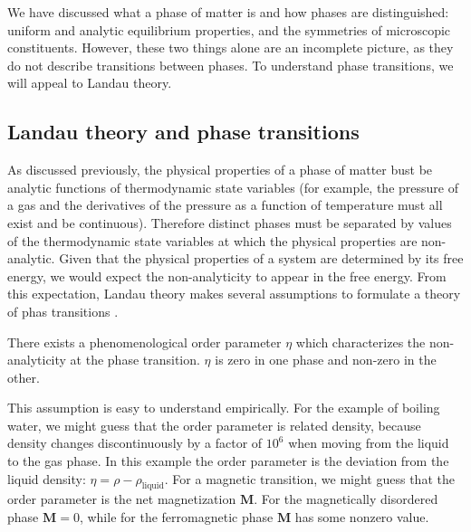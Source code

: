 \begin{center}
	\label{tbl:PhasesSymmetries}
\end{center}

We have discussed what a phase of matter is and how phases are distinguished: uniform and analytic equilibrium properties, and the symmetries of microscopic constituents. However, these two things alone are an incomplete picture, as they do not describe transitions between phases. To understand phase transitions, we will appeal to Landau theory.

\subsection{Landau theory and phase transitions}

As discussed previously, the physical properties of a phase of matter bust be analytic functions of thermodynamic state variables (for example, the pressure of a gas and the derivatives of the pressure as a function of temperature must all exist and be continuous). Therefore distinct phases must be separated by values of the thermodynamic state variables at which the physical properties are non-analytic. Given that the physical properties of a system are determined by its free energy, we would expect the non-analyticity to appear in the free energy. From this expectation, Landau theory makes several assumptions to formulate a theory of phas transitions \cite{Landau1969}.

\begin{assumption}
There exists a phenomenological order parameter $\eta$ which characterizes the non-analyticity at the phase transition. $\eta$ is zero in one phase and non-zero in the other.
\end{assumption}

This assumption is easy to understand empirically. For the example of boiling water, we might guess that the order parameter is related density, because density changes discontinuously by a factor of $10^6$ when moving from the liquid to the gas phase. In this example the order parameter is the deviation from the liquid density: $\eta = \rho - \rho_{\text{liquid}}$. For a magnetic transition, we might guess that the order parameter is the net magnetization $\mathbf{M}$. For the magnetically disordered phase $\mathbf{M} = 0$, while for the ferromagnetic phase $\mathbf{M}$ has some nonzero value.

